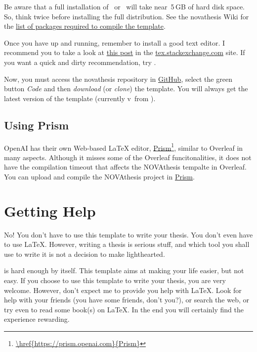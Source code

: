 Be aware that a full installation of \MikTeX\ or \TeXLive\ will take near~5\,GB of hard disk space.  So, think twice before installing the full distribution.  See the \gls{novathesis} Wiki for the \href{https://github.com/joaomlourenco/novathesis/wiki/installing-latex#minimal-installation-in-any-of-the-systems-above}{list of packages required to compile the template}.

Once you have  up and running, remember to install a good  text editor.  I recommend you to take a look at  \href{https://tex.stackexchange.com/questions/339/latex-editors-ides}{this post} in the \url{tex.stackexchange.com} site.  If you want a quick and dirty recommendation, try \href{https://www.texstudio.org/}{}.

Now, you must access the \gls{novathesis} repository in \href{https://github.com/joaomlourenco/novathesis}{GitHub}, select the green button \emph{Code} and then \emph{download} (or \emph{clone}) the template.  You will always get the latest version of the template (currently v\novathesisversion\ from \novathesisdate).


\subsection{Using Prism}
\label{sub:using_prism}

OpenAI has their own Web-based LaTeX editor, \href{https://prism.openai.com}{Prism}\footnote{\url{\href{https://prism.openai.com}{Prism}}}, similar to Overleaf in many aspects.  Although it misses some of the Overleaf funcitonalities, it does not have the compilation timeout that affects the NOVAthesis tempalte in Overleaf.  You can upload and compile the NOVAthesis project in \href{https://prism.openai.com}{Prism}.


\section{Getting Help}
\label{sec:getting_help}

\ntindex[Help]{}

No! You don't have to use this template to write your thesis.  You don't even have to use \LaTeX.  However, writing a thesis is serious stuff, and which tool you shall use to write it is not a decision to make lighthearted.

 is hard enough by itself.  This template aims at making your life easier, but not easy. If you choose to use this template to write your thesis, you are very welcome.  However, don't expect me to provide you help with \LaTeX.  Look for help with your friends (you have some friends, don't you?), or search the web, or try even to read some book(s) on \LaTeX. In the end you will certainly find the experience rewarding.

